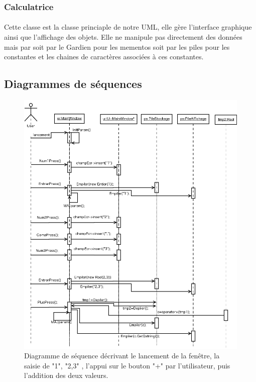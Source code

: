 \documentclass[a4paper,12pt]{article}
\begin{document}
		\subsubsection{Calculatrice}
			\paragraph{}Cette classe est la classe princiaple de notre UML, elle gère l'interface graphique ainsi que l'affichage des objets. Elle ne manipule pas directement des données mais par soit par le Gardien pour les mementos soit par les piles pour les constantes et les chaines de caractères associées à ces constantes.

	\subsection{Diagrammes de séquences}
		\begin{figure}[H]
			\center
			\includegraphics[width=16cm]{diag_seq_1.png}
			\caption{Diagramme de séquence décrivant le lancement de la fenêtre, la saisie de "1", "2,3" , l'appui sur le bouton "+" par l'utilisateur, puis l'addition des deux valeurs.}
		\end{figure}
\end{document}
